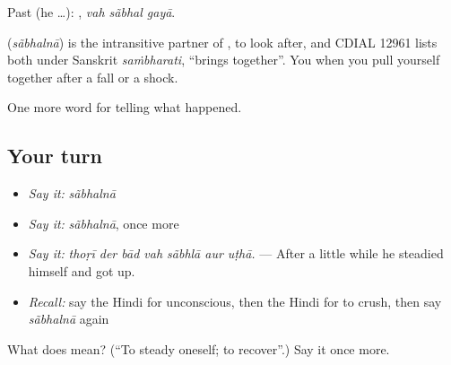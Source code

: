 Past (he …):   , \emph{vah sãbhal gayā}.

\begin{cousinweb}
\textbf{} (\emph{sãbhalnā}) is the intransitive partner of \textbf{}, to look after, and CDIAL 12961 lists both under Sanskrit \emph{saṁbharati}, \textquotedblleft{}brings together\textquotedblright{}. You \textbf{ } when you pull yourself together after a fall or a shock.
\end{cousinweb}

\begin{grammarlens}[title={What you've built}]
One more word for telling what happened.
\end{grammarlens}

\subsection*{Your turn}
\begin{itemize}
\raggedright
  \item \emph{Say it:} \emph{sãbhalnā}
  \item \emph{Say it:} \emph{sãbhalnā}, once more
  \item \emph{Say it:} \emph{thoṛī der bād vah sãbhlā aur uṭhā.} — After a little while he steadied himself and got up.
  \item \emph{Recall:} say the Hindi for unconscious, then the Hindi for to crush, then say \emph{sãbhalnā} again
\end{itemize}

\begin{tcolorbox}[breakable,colback=teal!4,colframe=teal!35!black,title={Before you move on}]
What does  mean? (\textquotedblleft{}To steady oneself; to recover\textquotedblright{}.) Say it once more.
\end{tcolorbox}
